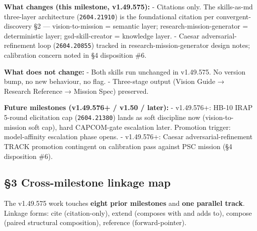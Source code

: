\documentclass[11pt,letterpaper]{article}
\newcommand{\arxivid}[1]{\texttt{\textcolor{accent}{#1}}}
\begin{document}
\textbf{What changes (this milestone, v1.49.575):} - Citations only. The
skills-as-md three-layer architecture (\arxivid{2604.21910}) is the
foundational citation per convergent-discovery §2 --- vision-to-mission
= semantic layer; research-mission-generator = deterministic layer;
gsd-skill-creator = knowledge layer. - Caesar adversarial-refinement
loop (\arxivid{2604.20855}) tracked in research-mission-generator design
notes; calibration concern noted in §4 disposition \#6.

\textbf{What does not change:} - Both skills run unchanged in v1.49.575.
No version bump, no new behaviour, no flag. - Three-stage output (Vision
Guide → Research Reference → Mission Spec) preserved.

\textbf{Future milestones (v1.49.576+ / v1.50 / later):} - v1.49.576+:
HB-10 IRAP 5-round elicitation cap (\arxivid{2604.21380}) lands as soft
discipline now (vision-to-mission soft cap), hard CAPCOM-gate escalation
later. Promotion trigger: model-affinity escalation phase opens. -
v1.49.576+: Caesar adversarial-refinement TRACK promotion contingent on
calibration pass against PSC mission (§4 disposition \#6).

\subsection{§3 Cross-milestone linkage
map}

The v1.49.575 work touches \textbf{eight prior milestones} and
\textbf{one parallel track}. Linkage forms: cite (citation-only), extend
(composes with and adds to), compose (paired structural composition),
reference (forward-pointer).
\end{document}
